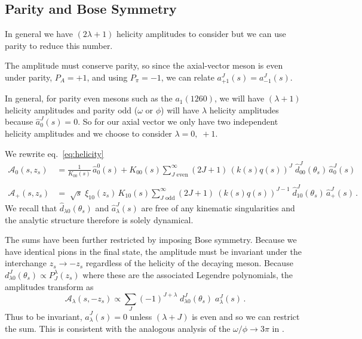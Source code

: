 \documentclass[10pt, aps,prd,amsmath,amssymb,superscriptaddress,onecolumn,
nofootinbib,showpacs,preprintnumbers]{revtex4-1}
\begin{document}
\subsection{Parity and Bose Symmetry}
In general we have \((2\lambda+1)\) helicity amplitudes to consider but we can use parity to reduce this number.

The amplitude must conserve parity, so since the axial-vector meson is even under parity, \( P_A = +1\), and using \(P_\pi = -1\), we can relate \(a_{+1}^J(s) = a_{-1}^J(s)\).

In general, for parity even mesons such as the \(a_1(1260)\), we will have \((\lambda +1)\) helicity amplitudes and parity odd (\(\omega \text{ or } \phi\)) will have \(\lambda\) helicity amplitudes because \(\hat{a}^J_0(s) = 0\). So for our axial vector we only have two independent helicity amplitudes and we choose to consider \(\lambda = 0,\; +1\).

We rewrite eq.~\ref{eq:helicity}
  \begin{align}
    \label{eq:model-helicity-zero}
    \mathcal{A}_0(s,z_s) &= \frac{1}{K_{00}(s)} \, \hat{a}^0_0(s) + K_{00}(s) \sum_{J \text{ even}}^\infty (2J+1) \, (k(s)q(s))^J \; \hat{d}_{00}^J(\theta_s) \, \hat{a}^J_0(s) \\
    \nonumber \\
    \label{eq:model-helicity-plus}
    \mathcal{A}_+(s,z_s) &= \; \sqrt{s} \; \xi_{10}(z_s) \, K_{10}(s) \sum_{J \text{ odd}}^\infty (2J+1) \ (k(s)q(s))^{J-1} \;  \hat{d}_{10}^J(\theta_s) \, \hat{a}^J_+(s) \,.
   \end{align}
We recall that \(\hat{d}_{\lambda 0}(\theta_s)\) and \(\hat{a}_\lambda^J(s)\) are free of any kinematic singularities and the analytic structure therefore is solely dynamical.

The sums have been further restricted by imposing Bose symmetry. Because we have identical pions in the final state, the amplitude must be invariant under the interchange \(z_s \to -z_s\) regardless of the helicity of the decaying meson.
Because \(d^J_{\lambda0}(\theta_s) \propto P^\lambda_J(z_s)\) where these are the associated Legendre polynomials, the amplitudes transform as
  \begin{equation}
   \mathcal{A}_\lambda(s, -z_s) \propto \sum_{J} (-1)^{J+\lambda} \; d^J_{\lambda0}(\theta_s) \; a^J_\lambda(s) \,.
  \end{equation}
Thus to be invariant, \(\hat{a}^J_{\lambda}(s) = 0\) unless \((\lambda+J)\) is even and so we can restrict the sum. This is consistent with the analogous analysis of the \(\omega/\phi \to 3\pi\) in \cite{Danilkin:2014cra,Niecknig:2012sj}.
\end{document}
